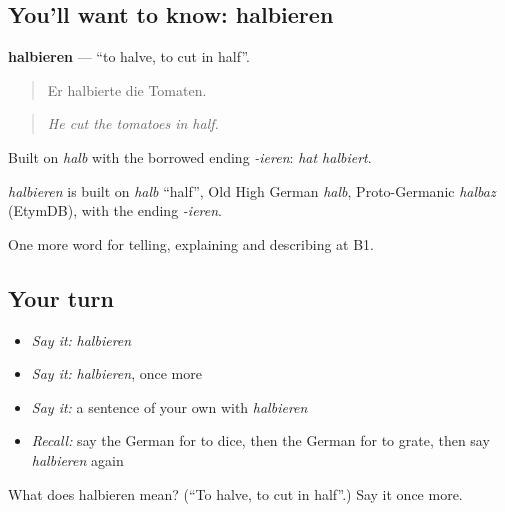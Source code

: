 \subsection*{You'll want to know: halbieren}
\textbf{halbieren} — \textquotedblleft{}to halve, to cut in half\textquotedblright{}.

\begin{quote}
Er halbierte die Tomaten.
\end{quote}

\begin{quote}
\emph{He cut the tomatoes in half.}
\end{quote}

Built on \emph{halb} with the borrowed ending \emph{-ieren}: \emph{hat halbiert}.

\begin{cousinweb}
\emph{halbieren} is built on \emph{halb} \textquotedblleft{}half\textquotedblright{}, Old High German \emph{halb}, Proto-Germanic \emph{halbaz} (EtymDB), with the ending \emph{-ieren}.
\end{cousinweb}

\begin{grammarlens}[title={What you've built}]
One more word for telling, explaining and describing at B1.
\end{grammarlens}

\subsection*{Your turn}
\begin{itemize}
\raggedright
  \item \emph{Say it:} \emph{halbieren}
  \item \emph{Say it:} \emph{halbieren}, once more
  \item \emph{Say it:} a sentence of your own with \emph{halbieren}
  \item \emph{Recall:} say the German for to dice, then the German for to grate, then say \emph{halbieren} again
\end{itemize}

\begin{tcolorbox}[breakable,colback=teal!4,colframe=teal!35!black,title={Before you move on}]
What does halbieren mean? (\textquotedblleft{}To halve, to cut in half\textquotedblright{}.) Say it once more.
\end{tcolorbox}
